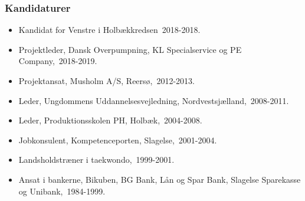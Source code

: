 \documentclass[11pt, a4paper]{awesome-cv}
\begin{document}
\begin{cvletter}
\subsubsection*{Kandidaturer}
\begin{itemize}
\item Kandidat for Venstre i Holbækkredsen 2018-2018.
\end{itemize}
\begin{itemize}
\item Projektleder, Dansk Overpumpning, KL Specialservice og PE Company, 2018-2019.
\item Projektansat, Musholm A/S, Reersø, 2012-2013.
\item Leder, Ungdommens Uddannelsesvejledning, Nordvestsjælland, 2008-2011.
\item Leder, Produktionsskolen PH, Holbæk, 2004-2008.
\item Jobkonsulent, Kompetenceporten, Slagelse, 2001-2004.
\item Landsholdstræner i taekwondo, 1999-2001.
\item Ansat i bankerne, Bikuben, BG Bank, Lån og Spar Bank, Slagelse Sparekasse og Unibank, 1984-1999.
\end{itemize}
\end{cvletter}
\end{document}
